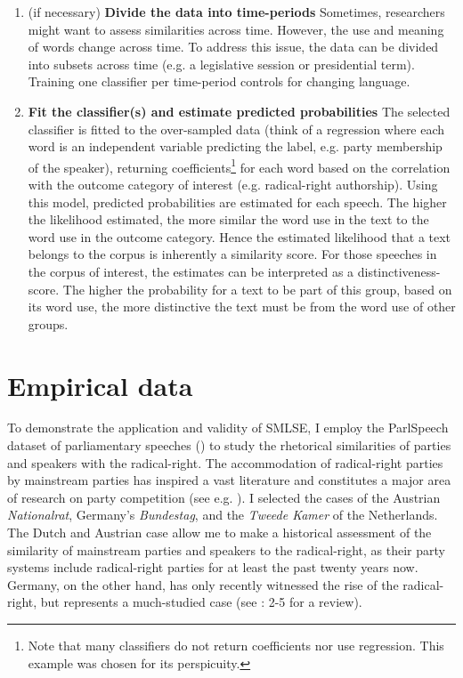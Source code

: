 \documentclass{article}
\begin{document}
\begin{enumerate}
    \item (if necessary) \textbf{Divide the data into time-periods} \newline Sometimes, researchers might want to assess similarities across time. However, the use and meaning of words change across time. To address this issue, the data can be divided into subsets across time (e.g. a legislative session or presidential term). Training one classifier per time-period controls for changing language.\par
    \item \textbf{Fit the classifier(s) and estimate predicted probabilities} \newline The selected classifier is fitted to the over-sampled data (think of a regression where each word is an independent variable predicting the label, e.g. party membership of the speaker), returning coefficients\footnote{Note that many classifiers do not return coefficients nor use regression. This example was chosen for its perspicuity.} for each word based on the correlation with the outcome category of interest (e.g. radical-right authorship). Using this model, predicted probabilities are estimated for each speech. The higher the likelihood estimated, the more similar the word use in the text to the word use in the outcome category. Hence the estimated likelihood that a text belongs to the corpus is inherently a similarity score. For those speeches in the corpus of interest, the estimates can be interpreted as a distinctiveness-score. The higher the probability for a text to be part of this group, based on its word use, the more distinctive the text must be from the word use of other groups.\par 
\end{enumerate}



\section{Empirical data}
To demonstrate the application and validity of SMLSE, I employ the ParlSpeech dataset of parliamentary speeches (\cite{Rauh2020}) to study the rhetorical similarities of parties and speakers with the radical-right. The accommodation of radical-right parties by mainstream parties has inspired a vast literature and constitutes a major area of research on party competition (see e.g. \cite{Arzheimer2009, Bale2010e, Dahlstrom2012a, Harmel1997a, Krause2019accomodation, Meguid2005b, Schumacher2014a, Spoon2020a, VanDerBrug2005b, VanSpanje2010, Wagner2017}). I selected the cases of the Austrian \textit{Nationalrat}, Germany's \textit{Bundestag}, and the \textit{Tweede Kamer} of the Netherlands. The Dutch and Austrian case allow me to make a historical assessment of the similarity of mainstream parties and speakers to the radical-right, as their party systems include radical-right parties for at least the past twenty years now. Germany, on the other hand, has only recently witnessed the rise of the radical-right, but represents a much-studied case (see \cite{Arzheimer2019}: 2-5 for a review).\par
\end{document}
